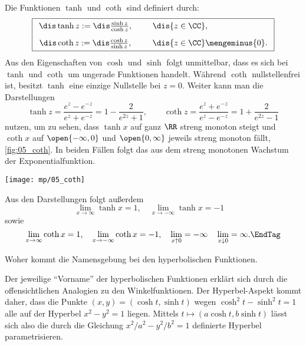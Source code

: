 \begin{antwort}
  Die Funktionen $\tanh$ und $\coth$ sind definiert durch: 
  \[\boxed{
    \begin{array}{cp{2mm}l}
      \dis \tanh z := \dis \frac{\sinh z}{\cosh z}, & & \dis {z\in\CC},\\[3mm]
      \dis \coth z := \dis \frac{\cosh z}{\sinh z}, & & \dis {z\in\CC}\mengeminus\{0\}.
    \end{array}}
  \]
  \noindent
  Aus den Eigenschaften von $\cosh$ und $\sinh$ folgt unmittelbar, dass 
  es sich bei $\tanh$ und $\coth$ um ungerade Funktionen handelt. Während 
  $\coth$ nullstellenfrei ist, besitzt $\tanh$ eine einzige Nullstelle bei 
  $z=0$. Weiter kann man die Darstellungen 
  \[
  \tanh z = \frac{e^z-e^{-z}}{e^z+e^{-z}} = 1-\frac{2}{e^{2z}+1},
  \qquad
  \coth z = \frac{e^z+e^{-z}}{e^z-e^{-z}} = 1+\frac{2}{e^{2z}-1}
  \]
  \noindent
  nutzen, um zu sehen, dass $\tanh x$ auf ganz $\RR$ streng 
  monoton steigt und $\coth x$ auf $\open{-\infty,0}$ 
  und $\open{0,\infty}$ jeweils streng monoton fällt, \sieheAbbildung\ref{fig:05_coth}. In beiden Fällen 
  folgt das aus dem streng monotonen Wachstum der Exponentialfunktion. 

  \begin{center}
    \texttt{[image: mp/05\_coth]}
    \label{fig:05_coth}
  \end{center}

  Aus den Darstellungen folgt außerdem
  \[
  \lim_{x\to\infty} \tanh x=1,\quad
  \lim_{x\to-\infty} \tanh x=-1\quad
  \]
  sowie
  \begin{equation}
    \lim_{x\to\infty} \coth x=1,\quad
    \lim_{x\to-\infty} \coth x=-1,\quad
    \lim_{x\uparrow 0} =-\infty\quad
    \lim_{x\downarrow 0} = \infty.
    \EndTag
  \end{equation}
\end{antwort}

\begin{frage}
  Woher kommt die Namensgebung bei den hyperbolischen Funktionen.
\end{frage}

\begin{antwort}
  Der jeweilige "`Vorname"' der hyperbolischen Funktionen erklärt sich 
  durch die offensichtlichen Analogien zu den Winkelfunktionen. 
  Der Hyperbel-Aspekt kommt daher, dass die Punkte 
  $(x,y)=(\cosh t, \sinh t)$ wegen $\cosh^2 t-\sinh^2 t=1$ alle auf der Hyperbel 
  $x^2-y^2=1$ liegen. Mittels $t \mapsto (a\cosh t, b\sinh t)$ lässt sich 
  also die durch die Gleichung $x^2/a^2-y^2/b^2=1$ definierte 
  Hyperbel parametrisieren.  
  \AntEnd
\end{antwort}


